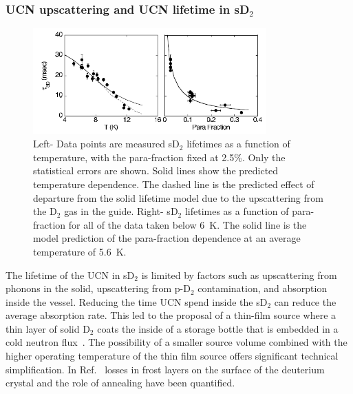 \subsubsection{UCN upscattering and UCN lifetime in sD$_2$}




\begin{figure}[h!]
\begin{center}
  \includegraphics[width=0.8\textwidth]{Morris2002.PNG} \caption{\cite{Morris2002}
    Left- Data points are measured sD$_2$ lifetimes as a function of
    temperature, with the para-fraction fixed at 2.5\%. Only the
    statistical errors are shown. Solid lines show the predicted
    temperature dependence. The dashed line is the predicted effect of
    departure from the solid lifetime model due to the upscattering
    from the D$_2$ gas in the guide. Right- sD$_2$ lifetimes as a
    function of para-fraction for all of the data taken below 6~K. The
    solid line is the model prediction of the para-fraction dependence
    at an average temperature of 5.6~K.  }
    \label{fig:Morris2002}
    \end{center}
\end{figure} 

The lifetime of the UCN in sD$_2$ is limited by factors such as
upscattering from phonons in the solid, upscattering from p-D$_2$
contamination, and absorption inside the vessel.  Reducing the time
UCN spend inside the sD$_2$ can reduce the average absorption
rate. This led to the proposal of a thin-film source where a thin
layer of solid D$_2$ coats the inside of a storage bottle that is
embedded in a cold neutron flux~\cite{Golub83}. The possibility of a
smaller source volume combined with the higher operating temperature
of the thin film source offers significant technical
simplification. In Ref.~\cite{anghel2018solid} losses in frost layers
on the surface of the deuterium crystal and the role of annealing have
been quantified.

